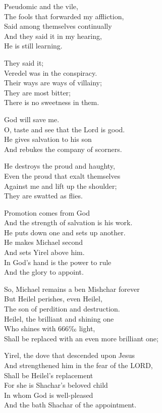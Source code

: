 \documentclass[
]{book}
\begin{document}
Pseudomic and the vile,\\
The fools that forwarded my affliction,\\
Said among themselves continually\\
And they said it in my hearing,\\
He is still learning.

They said it;\\
Veredel was in the conspiracy.\\
Their ways are ways of villainy;\\
They are most bitter;\\
There is no sweetness in them.

God will save me.\\
O, taste and see that the Lord is good.\\
He gives salvation to his son\\
And rebukes the company of scorners.

He destroys the proud and haughty,\\
Even the proud that exalt themselves\\
Against me and lift up the shoulder;\\
They are swatted as flies.

Promotion comes from God\\
And the strength of salvation is his work.\\
He puts down one and sets up another.\\
He makes Michael second\\
And sets Yirel above him.\\
In God's hand is the power to rule\\
And the glory to appoint.

So, Michael remains a ben Mishchar forever\\
But Heilel perishes, even Heilel,\\
The son of perdition and destruction.\\
Heilel, the brilliant and shining one\\
Who shines with 666‰ light,\\
Shall be replaced with an even more brilliant one;

Yirel, the dove that descended upon Jesus\\
And strengthened him in the fear of the LORD,\\
Shall be Heilel's replacement\\
For she is Shachar's beloved child\\
In whom God is well-pleased\\
And the bath Shachar of the appointment.
\end{document}
